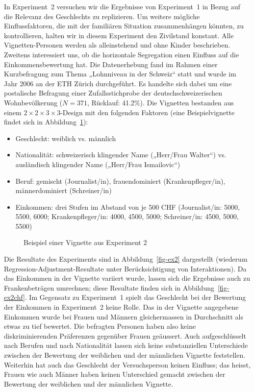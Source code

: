 \documentclass[a4paper,12pt]{article}
\renewcommand{\baselinestretch}{1.1}
\newif\ifcomments
\newcommand{\comment}[1]{%
    \ifcomments\marginpar{\renewcommand{\baselinestretch}{1}\tiny\hspace*{-1.1em}\colorbox{gray!20}%
    {\textcolor{red}{\parbox[t]{.9in}{\raggedright #1}}}}\fi}
\begin{document}
In Experiment~2 versuchen wir die Ergebnisse von Experiment~1 in Bezug auf die
Relevanz des Geschlechts zu replizieren. Um weitere mögliche Einflussfaktoren,
die mit der familiären Situation zusammenhängen könnten, zu kontrollieren,
halten wir in diesem Experiment den Zivilstand konstant. Alle
Vignetten-Personen werden als alleinstehend und ohne Kinder beschrieben.
Zweitens interessiert uns, ob die horizontale Segregation einen Einfluss auf
die Einkommensbewertung hat. Die Datenerhebung fand im Rahmen einer Kurzbefragung zum
Thema „Lohnniveau in der Schweiz“ statt und wurde im Jahr 2006 an der ETH
Zürich durchgeführt. Es handelte sich dabei um eine postalische Befragung einer
Zufallsstichprobe der deutschschweizerischen Wohnbevölkerung ($N = 371$,
Rücklauf: 41.2\%). Die Vignetten bestanden aus einem $2 \times 2 \times 3 \times
3$-Design mit den folgenden Faktoren (eine Beispielvignette findet sich in
Abbildung~\ref{fig-2}): \comment{Tabelle zu Faktoren wie bei Experiment 1}
\begin{itemize}
\item Geschlecht: weiblich vs. männlich
\item Nationalität: schweizerisch klingender Name („Herr/Frau Walter“) vs. ausländisch klingender Name („Herr/Frau Ismailovic“)
\item Beruf: gemischt (Journalist/in), frauendominiert (Krankenpfleger/in), männerdominiert (Schreiner/in)
\item Einkommen: drei Stufen im Abstand von je 500 CHF (Journalist/in: 5000, 5500, 6000; Krankenpfleger/in: 4000, 4500, 5000; 
Schreiner/in: 4500, 5000, 5500)
\end{itemize}

\begin{figure}\centering
    \caption{Beispiel einer Vignette aus Experiment 2}\label{fig-2}
\end{figure}

\noindent 
Die Resultate des Experiments sind in Abbildung~\ref{fig-ex2}
dargestellt (wiederum Regression-Adjustment-Resultate unter Berücksichtigung
von Interaktionen). Da das Einkommen in der Vignette variiert wurde, lassen sich die 
Ergebnisse auch zu Frankenbeträgen umrechnen; diese Resultate finden sich in 
Abbildung~\ref{fig-ex2chf}. Im Gegensatz zu Experiment~1 spielt das Geschlecht bei der
Bewertung der Einkommen in Experiment~2 keine Rolle. Das in der Vignette
angegebene Einkommen wurde bei Frauen und Männern gleichermassen in
Durchschnitt als etwas zu tief bewertet. Die befragten Personen haben also
keine diskriminierenden Präferenzen gegenüber Frauen geäussert. Auch
aufgeschlüsselt nach Berufen und nach Nationalität lassen sich keine
substanziellen Unterschiede zwischen der Bewertung der weiblichen und der
männlichen Vignette feststellen. Weiterhin hat auch das Geschlecht der
Versuchsperson keinen Einfluss; das heisst, Frauen wie auch Männer haben keinen
Unterschied gemacht zwischen der Bewertung der weiblichen und der männlichen
Vignette.
\end{document}
